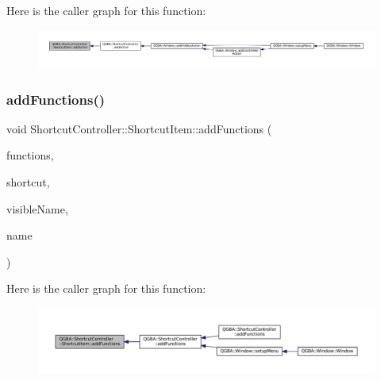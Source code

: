Here is the caller graph for this function\+:
\nopagebreak
\begin{figure}[H]
\begin{center}
\leavevmode
\includegraphics[width=350pt]{class_q_g_b_a_1_1_shortcut_controller_1_1_shortcut_item_ac26cc805175861b9c9f60685aecaca32_icgraph}
\end{center}
\end{figure}
\mbox{\label{class_q_g_b_a_1_1_shortcut_controller_1_1_shortcut_item_a3ea38540a01d538f00c249fa8b0084b5}} 
\subsubsection{\texorpdfstring{add\+Functions()}{addFunctions()}}
{\footnotesize\ttfamily void Shortcut\+Controller\+::\+Shortcut\+Item\+::add\+Functions (\begin{DoxyParamCaption}\item[{\mbox{\hyperlink{class_q_g_b_a_1_1_shortcut_controller_1_1_shortcut_item_a28ffcf4fe5bf253d0d47e2357794ddf1}{Functions}}}]{functions,  }\item[{\mbox{\hyperlink{ioapi_8h_a787fa3cf048117ba7123753c1e74fcd6}{int}}}]{shortcut,  }\item[{const Q\+String \&}]{visible\+Name,  }\item[{const Q\+String \&}]{name }\end{DoxyParamCaption})}

Here is the caller graph for this function\+:
\nopagebreak
\begin{figure}[H]
\begin{center}
\leavevmode
\includegraphics[width=350pt]{class_q_g_b_a_1_1_shortcut_controller_1_1_shortcut_item_a3ea38540a01d538f00c249fa8b0084b5_icgraph}
\end{center}
\end{figure}
\mbox{\label{class_q_g_b_a_1_1_shortcut_controller_1_1_shortcut_item_a0c8a572e52c50411436c115bfca4bd1d}} 
